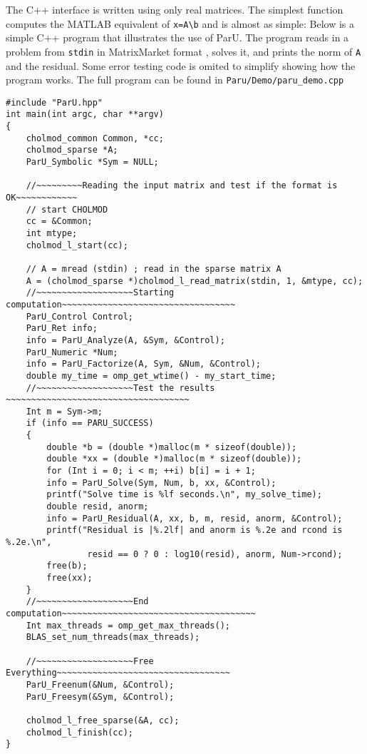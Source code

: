 \documentclass[12pt]{article}
\begin{document}
The C++ interface is written using only real matrices.  
The simplest function computes the MATLAB equivalent of
\verb'x=A\b' and is almost as simple:
Below is a simple C++ program that illustrates the use of ParU.  The
program reads in a problem from \verb'stdin' in MatrixMarket
format \cite{BoisvertPozoRemingtonBarrettDongarra97}, solves it, and prints the
norm of \verb'A' and the residual. 
Some error testing code is omited to simplify showing how the program works. 
The full program can be found in 
\verb'Paru/Demo/paru_demo.cpp'
\begin{verbatim}
#include "ParU.hpp"
int main(int argc, char **argv)
{
    cholmod_common Common, *cc;
    cholmod_sparse *A;
    ParU_Symbolic *Sym = NULL;

    //~~~~~~~~~Reading the input matrix and test if the format is OK~~~~~~~~~~~~
    // start CHOLMOD
    cc = &Common;
    int mtype;
    cholmod_l_start(cc);

    // A = mread (stdin) ; read in the sparse matrix A
    A = (cholmod_sparse *)cholmod_l_read_matrix(stdin, 1, &mtype, cc);
    //~~~~~~~~~~~~~~~~~~~Starting computation~~~~~~~~~~~~~~~~~~~~~~~~~~~~~~~~~~
    ParU_Control Control;
    ParU_Ret info;
    info = ParU_Analyze(A, &Sym, &Control);
    ParU_Numeric *Num;
    info = ParU_Factorize(A, Sym, &Num, &Control);
    double my_time = omp_get_wtime() - my_start_time;
    //~~~~~~~~~~~~~~~~~~~Test the results ~~~~~~~~~~~~~~~~~~~~~~~~~~~~~~~~~~~~
    Int m = Sym->m;
    if (info == PARU_SUCCESS)
    {
        double *b = (double *)malloc(m * sizeof(double));
        double *xx = (double *)malloc(m * sizeof(double));
        for (Int i = 0; i < m; ++i) b[i] = i + 1;
        info = ParU_Solve(Sym, Num, b, xx, &Control);
        printf("Solve time is %lf seconds.\n", my_solve_time);
        double resid, anorm;
        info = ParU_Residual(A, xx, b, m, resid, anorm, &Control);
        printf("Residual is |%.2lf| and anorm is %.2e and rcond is %.2e.\n",
                resid == 0 ? 0 : log10(resid), anorm, Num->rcond);
        free(b);
        free(xx);
    }
    //~~~~~~~~~~~~~~~~~~~End computation~~~~~~~~~~~~~~~~~~~~~~~~~~~~~~~~~~~~~~
    Int max_threads = omp_get_max_threads();
    BLAS_set_num_threads(max_threads);

    //~~~~~~~~~~~~~~~~~~~Free Everything~~~~~~~~~~~~~~~~~~~~~~~~~~~~~~~~~~
    ParU_Freenum(&Num, &Control);
    ParU_Freesym(&Sym, &Control);

    cholmod_l_free_sparse(&A, cc);
    cholmod_l_finish(cc);
}
\end{verbatim}
\end{document}
